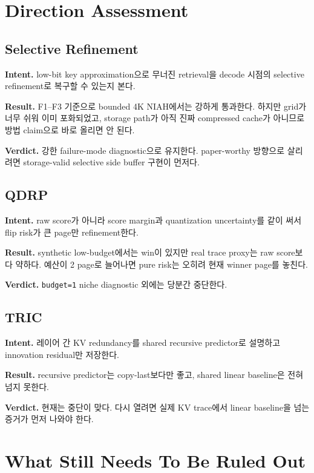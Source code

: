 \documentclass[11pt]{article}
\begin{document}
\section*{Direction Assessment}

\subsection*{Selective Refinement}

\textbf{Intent.} low-bit key approximation으로 무너진 retrieval을 decode 시점의 selective refinement로 복구할 수 있는지 본다.

\textbf{Result.} F1--F3 기준으로 bounded 4K NIAH에서는 강하게 통과한다. 하지만 grid가 너무 쉬워 이미 포화되었고, storage path가 아직 진짜 compressed cache가 아니므로 방법 claim으로 바로 올리면 안 된다.

\textbf{Verdict.} 강한 failure-mode diagnostic으로 유지한다. paper-worthy 방향으로 살리려면 storage-valid selective side buffer 구현이 먼저다.

\subsection*{QDRP}

\textbf{Intent.} raw score가 아니라 score margin과 quantization uncertainty를 같이 써서 flip risk가 큰 page만 refinement한다.

\textbf{Result.} synthetic low-budget에서는 win이 있지만 real trace proxy는 raw score보다 약하다. 예산이 2 page로 늘어나면 pure risk는 오히려 현재 winner page를 놓친다.

\textbf{Verdict.} \texttt{budget=1} niche diagnostic 외에는 당분간 중단한다.

\subsection*{TRIC}

\textbf{Intent.} 레이어 간 KV redundancy를 shared recursive predictor로 설명하고 innovation residual만 저장한다.

\textbf{Result.} recursive predictor는 copy-last보다만 좋고, shared linear baseline은 전혀 넘지 못한다.

\textbf{Verdict.} 현재는 중단이 맞다. 다시 열려면 실제 KV trace에서 linear baseline을 넘는 증거가 먼저 나와야 한다.

\section*{What Still Needs To Be Ruled Out}
\end{document}
